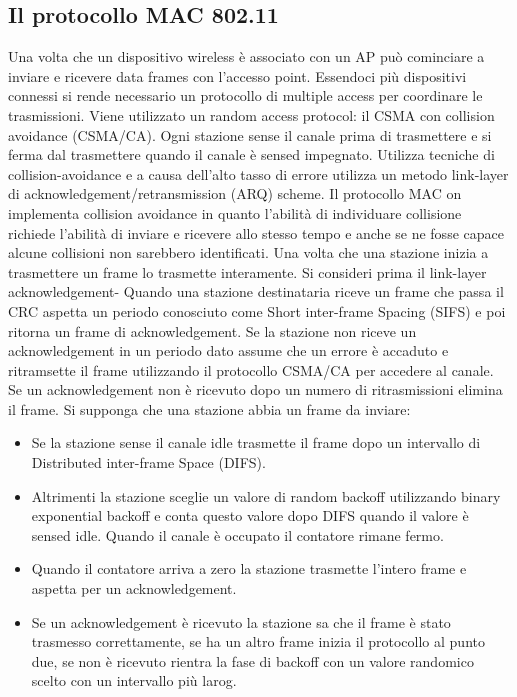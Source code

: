 \subsection{Il protocollo MAC 802.11}
Una volta che un dispositivo wireless \`e associato con un AP pu\`o cominciare a inviare e ricevere data frames con l'accesso point. Essendoci pi\`u dispositivi connessi si rende necessario un protocollo di 
multiple access per coordinare le trasmissioni. Viene utilizzato un random access protocol: il CSMA con collision avoidance (CSMA/CA). Ogni stazione sense il canale prima di trasmettere e si ferma dal 
trasmettere quando il canale \`e sensed impegnato. Utilizza tecniche di collision-avoidance e a causa dell'alto tasso di errore utilizza un metodo link-layer di acknowledgement/retransmission (ARQ) scheme.
Il protocollo MAC on implementa collision avoidance in quanto l'abilit\`a di individuare collisione richiede l'abilit\`a di inviare e ricevere allo stesso tempo e anche se ne fosse capace alcune collisioni non 
sarebbero identificati. Una volta che una stazione inizia a trasmettere un frame lo trasmette interamente. Si consideri prima il link-layer acknowledgement- Quando una stazione destinataria riceve un frame che
passa il CRC aspetta un periodo conosciuto come Short inter-frame Spacing (SIFS) e poi  ritorna un frame di acknowledgement. Se la stazione non riceve un acknowledgement in un periodo dato assume che un
errore \`e accaduto e ritramsette il frame utilizzando il protocollo CSMA/CA per accedere al canale. Se un acknowledgement non \`e ricevuto dopo un numero di ritrasmissioni elimina il frame. Si supponga che
una stazione abbia un frame da inviare:
\begin{itemize}
\item Se la stazione sense il canale idle trasmette il frame dopo un intervallo di Distributed inter-frame Space (DIFS).
\item Altrimenti la stazione sceglie un valore di random backoff utilizzando binary exponential backoff e conta questo valore dopo DIFS quando il valore \`e sensed idle. Quando il canale \`e occupato il contatore
rimane fermo.
\item Quando il contatore arriva a zero la stazione trasmette l'intero frame e aspetta per un acknowledgement.
\item Se un acknowledgement \`e ricevuto la stazione sa che il frame \`e stato trasmesso correttamente, se ha un altro frame inizia il protocollo al punto due, se non \`e ricevuto rientra la fase di backoff con un
valore randomico scelto con un intervallo pi\`u larog.
\end{itemize}
